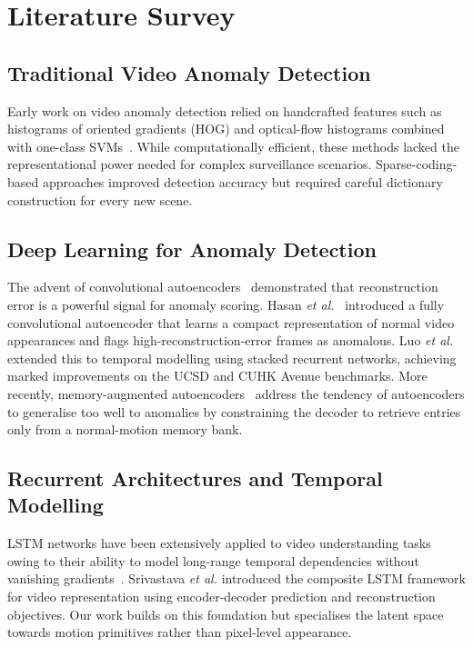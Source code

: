 \documentclass[conference]{IEEEtran}
\begin{document}
\section{Literature Survey}

\subsection{Traditional Video Anomaly Detection}
Early work on video anomaly detection relied on handcrafted features such
as histograms of oriented gradients (HOG) and optical-flow histograms
combined with one-class SVMs~\cite{ref_hog}.  While computationally
efficient, these methods lacked the representational power needed for
complex surveillance scenarios.  Sparse-coding-based approaches
\cite{ref_sparse} improved detection accuracy but required careful
dictionary construction for every new scene.

\subsection{Deep Learning for Anomaly Detection}
The advent of convolutional autoencoders~\cite{ref_conv_ae} demonstrated
that reconstruction error is a powerful signal for anomaly scoring.  Hasan
\textit{et al.}~\cite{ref_hasan2016} introduced a fully convolutional
autoencoder that learns a compact representation of normal video
appearances and flags high-reconstruction-error frames as anomalous.
Luo \textit{et al.}~\cite{ref_luo2017} extended this to temporal modelling
using stacked recurrent networks, achieving marked improvements on the
UCSD and CUHK Avenue benchmarks.  More recently, memory-augmented
autoencoders~\cite{ref_memae} address the tendency of autoencoders to
generalise too well to anomalies by constraining the decoder to retrieve
entries only from a normal-motion memory bank.

\subsection{Recurrent Architectures and Temporal Modelling}
LSTM networks have been extensively applied to video understanding tasks
owing to their ability to model long-range temporal dependencies without
vanishing gradients~\cite{ref_lstm}.  Srivastava \textit{et al.}\cite{ref_composite}
introduced the composite LSTM framework for video representation using
encoder-decoder prediction and reconstruction objectives.  Our work builds
on this foundation but specialises the latent space towards motion
primitives rather than pixel-level appearance.
\end{document}
